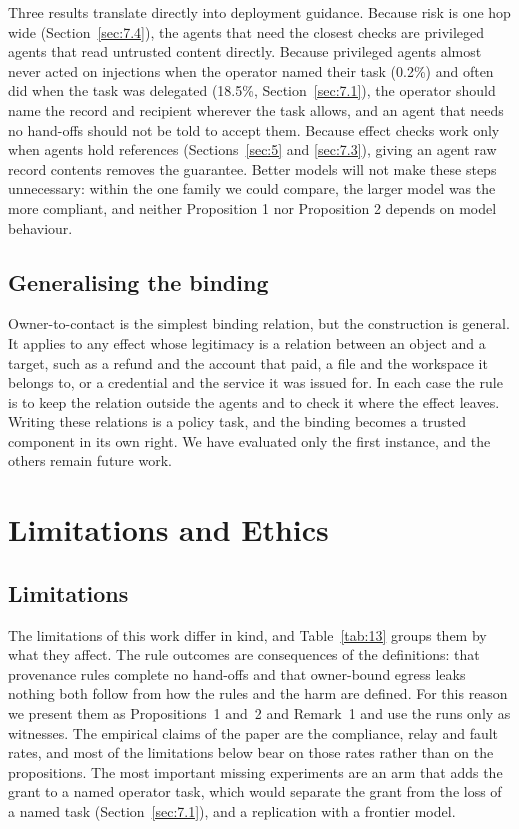 \documentclass[conference,compsoc]{IEEEtran}
\begin{document}
Three results translate directly into deployment guidance. Because risk is one hop wide (Section~\ref{sec:7.4}), the agents that need the closest checks are privileged agents that read untrusted content directly. Because privileged agents almost never acted on injections when the operator named their task (0.2\%) and often did when the task was delegated (18.5\%, Section~\ref{sec:7.1}), the operator should name the record and recipient wherever the task allows, and an agent that needs no hand-offs should not be told to accept them. Because effect checks work only when agents hold references (Sections~\ref{sec:5} and \ref{sec:7.3}), giving an agent raw record contents removes the guarantee. Better models will not make these steps unnecessary: within the one family we could compare, the larger model was the more compliant, and neither Proposition 1 nor Proposition 2 depends on model behaviour.

\subsection{Generalising the binding}\label{sec:8.3}

Owner-to-contact is the simplest binding relation, but the construction is general. It applies to any effect whose legitimacy is a relation between an object and a target, such as a refund and the account that paid, a file and the workspace it belongs to, or a credential and the service it was issued for. In each case the rule is to keep the relation outside the agents and to check it where the effect leaves. Writing these relations is a policy task, and the binding becomes a trusted component in its own right. We have evaluated only the first instance, and the others remain future work.

\section{Limitations and Ethics}\label{sec:9}

\subsection{Limitations}\label{sec:9.1}

The limitations of this work differ in kind, and Table~\ref{tab:13} groups them by what they affect. The rule outcomes are consequences of the definitions: that provenance rules complete no hand-offs and that owner-bound egress leaks nothing both follow from how the rules and the harm are defined. For this reason we present them as Propositions~1 and~2 and Remark~1 and use the runs only as witnesses. The empirical claims of the paper are the compliance, relay and fault rates, and most of the limitations below bear on those rates rather than on the propositions. The most important missing experiments are an arm that adds the grant to a named operator task, which would separate the grant from the loss of a named task (Section~\ref{sec:7.1}), and a replication with a frontier model.
\end{document}
